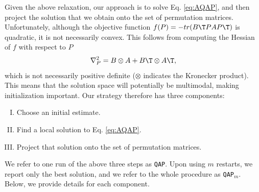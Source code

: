 \documentclass[10pt,journal,cspaper,compsoc]{IEEEtran}
\begin{document}

Given the above relaxation, our approach is to solve Eq. \eqref{eq:AQAP}, and then project the solution that we obtain onto the set of permutation matrices.  Unfortunately, although the objective function $f(P)=- tr(B\T PAP\T)$ is quadratic, it is not necessarily convex.  This follows from computing the Hessian of $f$  with respect to $P$
\begin{align}
	\nabla_P^2  =  B \otimes A + B\T \otimes A\T,
\end{align}
which is not necessarily positive definite ($\otimes$ indicates the Kronecker product). This means that the solution space will potentially be multimodal, making initialization important.  Our strategy therefore has three components:
\begin{enumerate}[I.]
	\item Choose an initial estimate.
	\item Find a local solution to Eq. \eqref{eq:AQAP}.
	\item Project that solution onto the set of permutation matrices.
\end{enumerate}
We refer to one run of the above three steps as \texttt{QAP}.  Upon using $m$ restarts, we report only the best solution, and we refer to the whole procedure as \texttt{QAP}$_m$.  Below, we provide details for each component.
\end{document}
